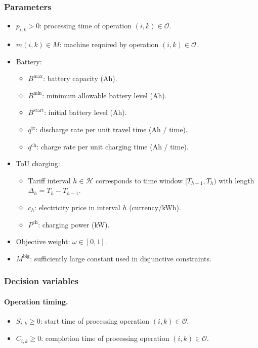 \documentclass[preprint, 3p, review, 12pt]{elsarticle}
\begin{document}
\subsubsection{Parameters}
\begin{itemize}
  \item $p_{i,k}>0$: processing time of operation $(i,k)\in\mathcal{O}$.
  \item $m(i,k)\in M$: machine required by operation $(i,k)\in\mathcal{O}$.
  \item Battery:
  \begin{itemize}
    \item $B^{\max}$: battery capacity (Ah).
    \item $B^{\min}$: minimum allowable battery level (Ah).
    \item $B^{\mathrm{start}}$: initial battery level (Ah).
    \item $q^{\mathrm{tr}}$: discharge rate per unit travel time (Ah / time).
    \item $q^{\mathrm{ch}}$: charge rate per unit charging time (Ah / time).
  \end{itemize}
  \item ToU charging:
  \begin{itemize}
    \item Tariff interval $h\in\mathcal{H}$ corresponds to time window $[T_{h-1},T_h)$ with length $\Delta_h=T_h-T_{h-1}$.
    \item $c_h$: electricity price in interval $h$ (currency/kWh).
    \item $P^{\mathrm{ch}}$: charging power (kW).
  \end{itemize}
  \item Objective weight: $\omega\in[0,1]$.
  \item $M^{\mathrm{big}}$: sufficiently large constant used in disjunctive constraints.
\end{itemize}

\subsubsection{Decision variables}
\paragraph{Operation timing.}
\begin{itemize}
  \item $S_{i,k}\ge 0$: start time of processing operation $(i,k)\in\mathcal{O}$.
  \item $C_{i,k}\ge 0$: completion time of processing operation $(i,k)\in\mathcal{O}$.
\end{itemize}
\end{document}
